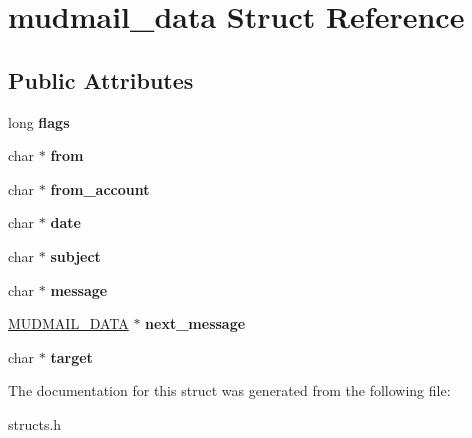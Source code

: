 \hypertarget{structmudmail__data}{\section{mudmail\-\_\-data Struct Reference}
\label{structmudmail__data}
}
\subsection*{Public Attributes}
\begin{DoxyCompactItemize}
\item 
\hypertarget{structmudmail__data_a147f443bec36861233b0a60b6e0f7af5}{long {\bfseries flags}}\label{structmudmail__data_a147f443bec36861233b0a60b6e0f7af5}

\item 
\hypertarget{structmudmail__data_a848d4702ba770327fa5aff376bc92198}{char $\ast$ {\bfseries from}}\label{structmudmail__data_a848d4702ba770327fa5aff376bc92198}

\item 
\hypertarget{structmudmail__data_a1ed7bbe5b5ef960746276eec8dcb6fd2}{char $\ast$ {\bfseries from\-\_\-account}}\label{structmudmail__data_a1ed7bbe5b5ef960746276eec8dcb6fd2}

\item 
\hypertarget{structmudmail__data_afe51d78012144e891770924377d69cb0}{char $\ast$ {\bfseries date}}\label{structmudmail__data_afe51d78012144e891770924377d69cb0}

\item 
\hypertarget{structmudmail__data_a20c6c5399fff1a90cdac0c0b73002015}{char $\ast$ {\bfseries subject}}\label{structmudmail__data_a20c6c5399fff1a90cdac0c0b73002015}

\item 
\hypertarget{structmudmail__data_a2c7609bbdbdbc97bc887169c3d1695b0}{char $\ast$ {\bfseries message}}\label{structmudmail__data_a2c7609bbdbdbc97bc887169c3d1695b0}

\item 
\hypertarget{structmudmail__data_ad9ea84d9aee3e14620844b27cb7fb339}{\hyperlink{structmudmail__data}{M\-U\-D\-M\-A\-I\-L\-\_\-\-D\-A\-T\-A} $\ast$ {\bfseries next\-\_\-message}}\label{structmudmail__data_ad9ea84d9aee3e14620844b27cb7fb339}

\item 
\hypertarget{structmudmail__data_af9ab5071510e2e8cd1baabb8cce608ef}{char $\ast$ {\bfseries target}}\label{structmudmail__data_af9ab5071510e2e8cd1baabb8cce608ef}

\end{DoxyCompactItemize}


The documentation for this struct was generated from the following file\-:\begin{DoxyCompactItemize}
\item 
structs.\-h\end{DoxyCompactItemize}
